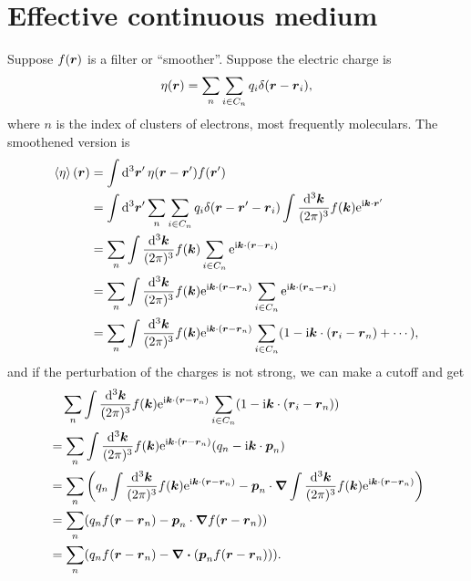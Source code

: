 \documentclass[hyperref, a4paper]{article}
\newcommand*{\ii}{\mathrm{i}}
\newcommand*{\ee}{\mathrm{e}}
\begin{document}
\section{Effective continuous medium}

Suppose $f(\vb*{r})$ is a filter or ``smoother''. Suppose the electric charge is 
\begin{equation}
    \eta(\vb*{r}) = \sum_n \sum_{i \in C_n} q_i \delta(\vb*{r} - \vb*{r}_i),
\end{equation}
where $n$ is the index of clusters of electrons, most frequently moleculars. The smoothened version is 
\[
    \begin{aligned}
        \expval{\eta}(\vb*{r}) &= \int \dd[3]{\vb*{r}'} \eta(\vb*{r} - \vb*{r}') f(\vb*{r}') \\
        &= \int \dd[3]{\vb*{r}'} \sum_n \sum_{i \in C_n} q_i \delta(\vb*{r} - \vb*{r}' - \vb*{r}_i) 
        \int \frac{\dd[3]{\vb*{k}}}{(2\pi)^3} f(\vb*{k}) \ee^{\ii \vb*{k} \cdot \vb*{r}'} \\
        &= \sum_n \int \frac{\dd[3]{\vb*{k}}}{(2\pi)^3} f(\vb*{k}) \sum_{i \in C_n} \ee^{\ii \vb*{k} \cdot (\vb*{r} - \vb*{r}_i)} \\
        &= \sum_n \int \frac{\dd[3]{\vb*{k}}}{(2\pi)^3} f(\vb*{k}) \ee^{\ii \vb*{k} \cdot (\vb*{r} - \vb*{r}_n)} \sum_{i \in C_n} \ee^{\ii \vb*{k} \cdot (\vb*{r}_n - \vb*{r}_i)} \\
        &= \sum_n \int \frac{\dd[3]{\vb*{k}}}{(2\pi)^3} f(\vb*{k}) \ee^{\ii \vb*{k} \cdot (\vb*{r} - \vb*{r}_n)} \sum_{i \in C_n} (1 - \ii \vb*{k} \cdot (\vb*{r}_i - \vb*{r}_n) + \cdots),
    \end{aligned}
\]
and if the perturbation of the charges is not strong, we can make a cutoff and get 
\[
    \begin{aligned}
        &\quad \sum_n \int \frac{\dd[3]{\vb*{k}}}{(2\pi)^3} f(\vb*{k}) \ee^{\ii \vb*{k} \cdot (\vb*{r} - \vb*{r}_n)} \sum_{i \in C_n} (1 - \ii \vb*{k} \cdot (\vb*{r}_i - \vb*{r}_n)) \\
        &= \sum_n \int \frac{\dd[3]{\vb*{k}}}{(2\pi)^3} f(\vb*{k}) \ee^{\ii \vb*{k} \cdot (\vb*{r} - \vb*{r}_n)} (q_n - \ii \vb*{k} \cdot \vb*{p}_n) \\
        &= \sum_n \left( q_n \int \frac{\dd[3]{\vb*{k}}}{(2\pi)^3} f(\vb*{k}) \ee^{\ii \vb*{k} \cdot (\vb*{r} - \vb*{r}_n)} - \vb*{p}_n \cdot \grad \int \frac{\dd[3]{\vb*{k}}}{(2\pi)^3} f(\vb*{k}) \ee^{\ii \vb*{k} \cdot (\vb*{r} - \vb*{r}_n)}  \right) \\
        &= \sum_n (q_n f(\vb*{r} - \vb*{r}_n) - \vb*{p}_n \cdot \grad f(\vb*{r} - \vb*{r}_n)) \\
        &= \sum_n (q_n f(\vb*{r} - \vb*{r}_n) - \div(\vb*{p}_n f(\vb*{r} - \vb*{r}_n))) .
    \end{aligned}
\]
\end{document}
